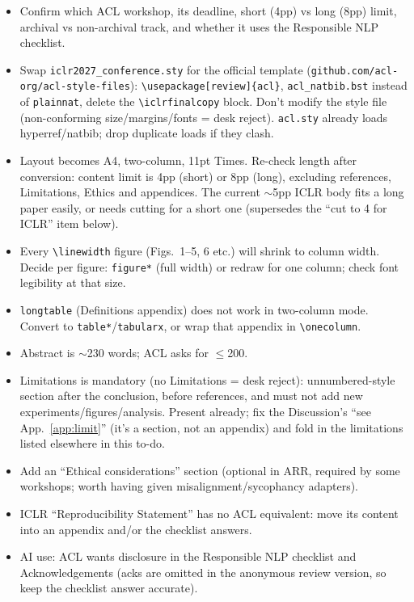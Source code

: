\documentclass{article}
\begin{document}
\begin{itemize}
  \item Confirm which ACL workshop, its deadline, short (4pp) vs long (8pp) limit, archival vs non-archival track, and whether it uses the Responsible NLP checklist.
  \item Swap \texttt{iclr2027\_conference.sty} for the official template (\texttt{github.com/acl-org/acl-style-files}): \texttt{\textbackslash usepackage[review]\{acl\}}, \texttt{acl\_natbib.bst} instead of \texttt{plainnat}, delete the \texttt{\textbackslash iclrfinalcopy} block. Don't modify the style file (non-conforming size/margins/fonts = desk reject). \texttt{acl.sty} already loads hyperref/natbib; drop duplicate loads if they clash.
  \item Layout becomes A4, two-column, 11pt Times. Re-check length after conversion: content limit is 4pp (short) or 8pp (long), excluding references, Limitations, Ethics and appendices. The current $\sim$5pp ICLR body fits a long paper easily, or needs cutting for a short one (supersedes the ``cut to 4 for ICLR'' item below).
  \item Every \texttt{\textbackslash linewidth} figure (Figs.~1--5, 6 etc.) will shrink to column width. Decide per figure: \texttt{figure*} (full width) or redraw for one column; check font legibility at that size.
  \item \texttt{longtable} (Definitions appendix) does not work in two-column mode. Convert to \texttt{table*}/\texttt{tabularx}, or wrap that appendix in \texttt{\textbackslash onecolumn}.
  \item Abstract is $\sim$230 words; ACL asks for $\le$200.
  \item Limitations is mandatory (no Limitations = desk reject): unnumbered-style section after the conclusion, before references, and must not add new experiments/figures/analysis. Present already; fix the Discussion's ``see App.~\ref{app:limit}'' (it's a section, not an appendix) and fold in the limitations listed elsewhere in this to-do.
  \item Add an ``Ethical considerations'' section (optional in ARR, required by some workshops; worth having given misalignment/sycophancy adapters).
  \item ICLR ``Reproducibility Statement'' has no ACL equivalent: move its content into an appendix and/or the checklist answers.
  \item AI use: ACL wants disclosure in the Responsible NLP checklist and Acknowledgements (acks are omitted in the anonymous review version, so keep the checklist answer accurate).

\end{itemize}
\end{document}
